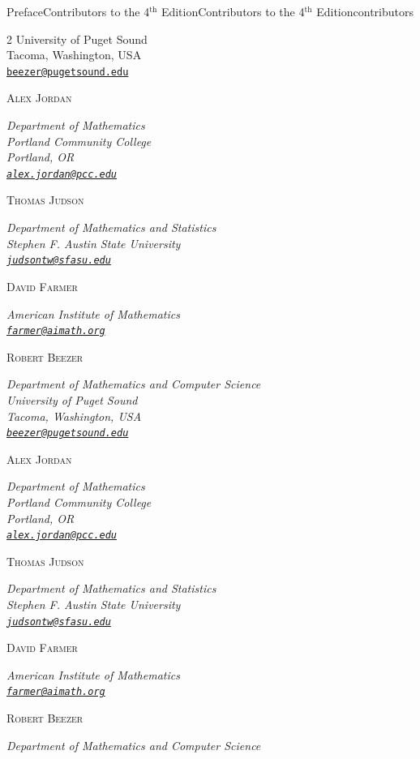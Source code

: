 \documentclass[oneside,10pt,]{book}
\newcommand{\mono}[1]{\texttt{#1}}
\numberwithin{equation}{section}
\newcommand{\contributor}[1]{\parbox{\linewidth}{#1}\par\bigskip}
\newcommand{\contributorname}[1]{\textsc{#1}\\[0.25\baselineskip]}
\newcommand{\contributorinfo}[1]{\hspace*{0.05\linewidth}\parbox{0.95\linewidth}{\textsl{#1}}}
\begin{document}
\begin{preface}{Preface}{Contributors to the 4\(^\mathrm{th}\) Edition}{}{Contributors to the 4\(^\mathrm{th}\) Edition}{}{}{contributors}
\begin{multicols}{2}
{{University of Puget Sound\\
Tacoma, Washington, USA\\
\mono{\href{mailto:beezer@pugetsound.edu}{\nolinkurl{beezer@pugetsound.edu}}}}%
}%
\hypertarget{ajordan}{}%
\contributor{%
\contributorname{Alex Jordan}%
\contributorinfo{Department of Mathematics\\
Portland Community College\\
Portland, OR\\
\mono{\href{mailto:alex.jordan@pcc.edu}{\nolinkurl{alex.jordan@pcc.edu}}}}%
}%
\hypertarget{contributors-3-9}{}%
\contributor{%
\contributorname{Thomas Judson}%
\contributorinfo{Department of Mathematics and Statistics\\
Stephen F. Austin State University\\
\mono{\href{mailto:judsontw@sfasu.edu}{\nolinkurl{judsontw@sfasu.edu}}}}%
}%
\hypertarget{contributors-3-10}{}%
\contributor{%
\contributorname{David Farmer}%
\contributorinfo{American Institute of Mathematics\\
\mono{\href{mailto:farmer@aimath.org}{\nolinkurl{farmer@aimath.org}}}}%
}%
\hypertarget{contributors-3-11}{}%
\contributor{%
\contributorname{Robert Beezer}%
\contributorinfo{Department of Mathematics and Computer Science\\
University of Puget Sound\\
Tacoma, Washington, USA\\
\mono{\href{mailto:beezer@pugetsound.edu}{\nolinkurl{beezer@pugetsound.edu}}}}%
}%
\hypertarget{contributors-3-12}{}%
\contributor{%
\contributorname{Alex Jordan}%
\contributorinfo{Department of Mathematics\\
Portland Community College\\
Portland, OR\\
\mono{\href{mailto:alex.jordan@pcc.edu}{\nolinkurl{alex.jordan@pcc.edu}}}}%
}%
\hypertarget{contributors-3-13}{}%
\contributor{%
\contributorname{Thomas Judson}%
\contributorinfo{Department of Mathematics and Statistics\\
Stephen F. Austin State University\\
\mono{\href{mailto:judsontw@sfasu.edu}{\nolinkurl{judsontw@sfasu.edu}}}}%
}%
\hypertarget{contributors-3-14}{}%
\contributor{%
\contributorname{David Farmer}%
\contributorinfo{American Institute of Mathematics\\
\mono{\href{mailto:farmer@aimath.org}{\nolinkurl{farmer@aimath.org}}}}%
}%
\hypertarget{rbeezer}{}%
\contributor{%
\contributorname{Robert Beezer}%
\contributorinfo{Department of Mathematics and Computer Science\\
}}
\end{multicols}
\end{preface}
\end{document}
